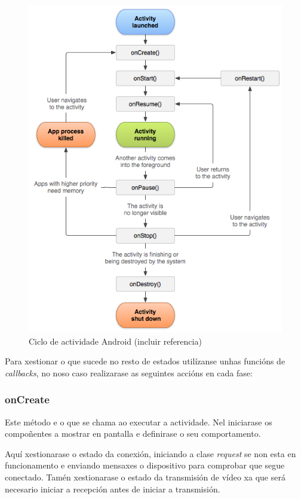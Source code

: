\begin{figure}[tb]
  \centering
  \includegraphics[scale=.6]{imaxes/ciclo-actividade.png}
  \caption{Ciclo de actividade Android (incluir referencia)}
  \label{f:actividade}
\end{figure}

Para xestionar o que sucede no resto de estados utilízanse unhas funcións de \emph{callbacks}, no noso caso realizarase as seguintes accións en cada fase:
\subsubsection{onCreate}
Este método e o que se chama ao executar a actividade. Nel iniciarase os compoñentes a mostrar en pantalla e definirase o seu comportamento.

Aquí xestionarase o estado da conexión, iniciando a clase \emph{request} se non esta en funcionamento e enviando mensaxes o dispositivo para comprobar que segue conectado. Tamén xestionarase o estado da transmisión de vídeo xa que será necesario iniciar a recepción antes de iniciar a transmisión.
